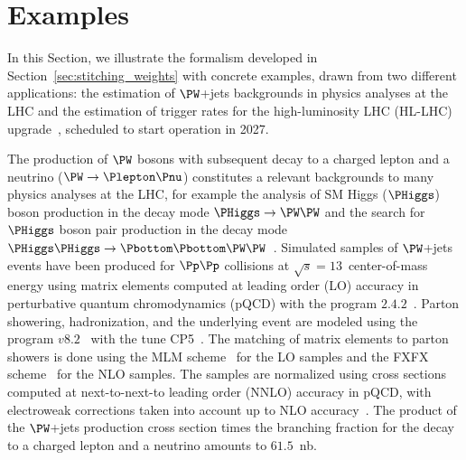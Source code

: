 \section{Examples}
\label{sec:examples}

In this Section, we illustrate the formalism developed in Section~\ref{sec:stitching_weights} with concrete examples,
drawn from two different applications: the estimation of 
$\PW$+jets backgrounds in physics analyses at the LHC
and the estimation of trigger rates for the high-luminosity LHC (HL-LHC) upgrade~\cite{TDR_Phase2_LHC},
scheduled to start operation in 2027.

The 
production of $\PW$ bosons with subsequent decay to a charged lepton and a neutrino ($\PW \to \Plepton\Pnu$)
constitutes a relevant backgrounds to many physics analyses at the LHC,
for example the analysis of SM Higgs ($\PHiggs$) boson production in the decay 
mode $\PHiggs \to \PW\PW$
and the search for $\PHiggs$ boson pair production in the decay 
mode $\PHiggs\PHiggs \to \Pbottom\Pbottom\PW\PW$~\cite{ATLAS:2014aga,Aad:2019yxi,CMS-HIG-13-027,CMS-HIG-17-006}.
Simulated samples of $\PW$+jets 
events have been produced for $\Pp\Pp$ collisions at $\sqrt{s}=13$~\TeV center-of-mass energy
using matrix elements computed at leading order (LO) 
accuracy in perturbative quantum chromodynamics (pQCD)
with the program \MGvATNLO $2.4.2$~\cite{Alwall:2014hca}.
Parton showering, hadronization, and the underlying event are modeled using the program \PYTHIA $v8.2$~\cite{Sjostrand:2014zea} with the tune \textrm{CP5}~\cite{Sirunyan:2019dfx}.
The matching of matrix elements to parton showers is done using the \textrm{MLM} scheme~\cite{Alwall:2007fs} for the LO samples
and the \textrm{FXFX} scheme~\cite{Frederix:2012ps} for the NLO samples.
The 
samples are normalized using cross sections computed at next-to-next-to leading order (NNLO) accuracy in pQCD,
with electroweak corrections taken into account up to NLO accuracy~\cite{Li:2012wna}.
The product of the $\PW$+jets production cross section times the branching fraction for the decay to a charged lepton and a neutrino amounts to $61.5$~nb.

